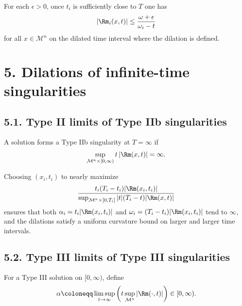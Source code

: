 \begin{remark}
\label{ch08-rem-type-i-curvature-bound-after-rescaling}
For each \(\epsilon>0\), once \(t_i\) is sufficiently close to \(T\) one has
\[
|\Rm_i(x,t)|\le \frac{\omega+\epsilon}{\omega_i-t}
\]
for all \(x\in\mathcal M^n\) on the dilated time interval where the dilation is defined.
\end{remark}

\section*{5. Dilations of infinite-time singularities}

\subsection*{5.1. Type II limits of Type IIb singularities}

\begin{remark}
\label{ch08-rem-type-iib-condition}
A solution forms a Type IIb singularity at \(T=\infty\) if
\[
\sup_{\mathcal M^n\times[0,\infty)} t\,|\Rm(x,t)|=\infty.
\]
\end{remark}

\begin{remark}
\label{ch08-rem-refined-type-iib-rescaling}
Choosing \((x_i,t_i)\) to nearly maximize
\[
\frac{t_i(T_i-t_i)|\Rm(x_i,t_i)|}{\sup_{\mathcal M^n\times[0,T_i]}|t|(T_i-t)|\Rm(x,t)|}
\]
ensures that both \(\alpha_i=t_i|\Rm(x_i,t_i)|\) and \(\omega_i=(T_i-t_i)|\Rm(x_i,t_i)|\) tend to \(\infty\), and the dilations satisfy a uniform curvature bound on larger and larger time intervals.
\end{remark}

\subsection*{5.2. Type III limits of Type III singularities}

\begin{definition}
\label{ch08-def-type-iii-limsup-scale}
For a Type III solution on \([0,\infty)\), define
\[
\alpha\coloneqq \limsup_{t\to\infty}\left(t\sup_{\mathcal M^n}|\Rm(\cdot,t)|\right)\in[0,\infty).
\]
\end{definition}

